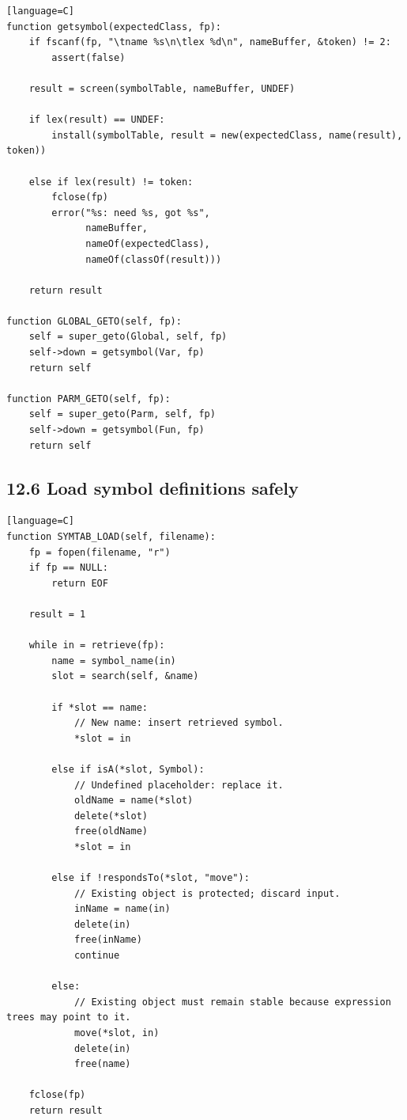 \documentclass[11pt]{article}
\begin{document}
\begin{verbatim}[language=C]
function getsymbol(expectedClass, fp):
    if fscanf(fp, "\tname %s\n\tlex %d\n", nameBuffer, &token) != 2:
        assert(false)

    result = screen(symbolTable, nameBuffer, UNDEF)

    if lex(result) == UNDEF:
        install(symbolTable, result = new(expectedClass, name(result), token))

    else if lex(result) != token:
        fclose(fp)
        error("%s: need %s, got %s",
              nameBuffer,
              nameOf(expectedClass),
              nameOf(classOf(result)))

    return result

function GLOBAL_GETO(self, fp):
    self = super_geto(Global, self, fp)
    self->down = getsymbol(Var, fp)
    return self

function PARM_GETO(self, fp):
    self = super_geto(Parm, self, fp)
    self->down = getsymbol(Fun, fp)
    return self
\end{verbatim}

\subsection{12.6 Load symbol definitions
safely}\label{load-symbol-definitions-safely}

\begin{verbatim}[language=C]
function SYMTAB_LOAD(self, filename):
    fp = fopen(filename, "r")
    if fp == NULL:
        return EOF

    result = 1

    while in = retrieve(fp):
        name = symbol_name(in)
        slot = search(self, &name)

        if *slot == name:
            // New name: insert retrieved symbol.
            *slot = in

        else if isA(*slot, Symbol):
            // Undefined placeholder: replace it.
            oldName = name(*slot)
            delete(*slot)
            free(oldName)
            *slot = in

        else if !respondsTo(*slot, "move"):
            // Existing object is protected; discard input.
            inName = name(in)
            delete(in)
            free(inName)
            continue

        else:
            // Existing object must remain stable because expression trees may point to it.
            move(*slot, in)
            delete(in)
            free(name)

    fclose(fp)
    return result
\end{verbatim}
\end{document}
